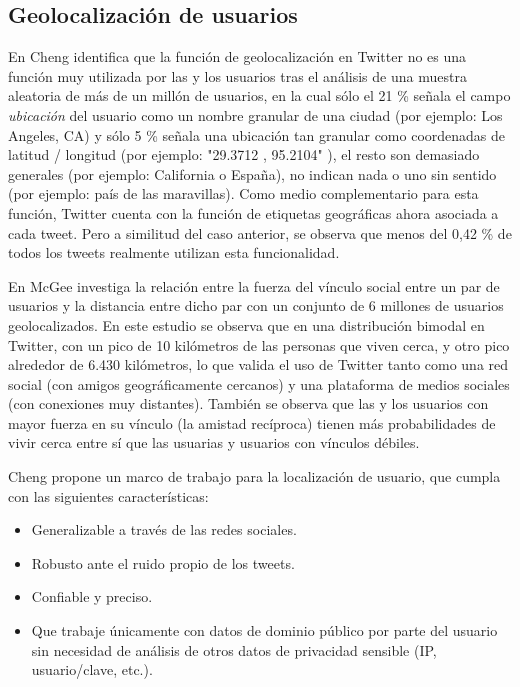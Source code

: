 \subsection{Geolocalización de usuarios} \label{sebsec:geoestadoarte}

 En \cite{Cheng:2010:YYT:1871437.1871535} Cheng identifica que la función de geolocalización en Twitter no es una función muy utilizada por las y los usuarios tras el análisis de una muestra aleatoria de más de un millón de usuarios, en la cual sólo el 21 \% señala el campo \emph{ubicación} del usuario como un nombre granular de una ciudad (por ejemplo: Los Angeles, CA) y sólo 5 \% señala una ubicación tan granular como coordenadas de latitud / longitud (por ejemplo: "29.3712 , 95.2104" ), el resto son demasiado generales (por ejemplo: California o España), no indican nada o uno sin sentido (por ejemplo: país de las maravillas). Como medio complementario para esta función, Twitter cuenta con la función de etiquetas geográficas ahora asociada a cada tweet. Pero a similitud del caso anterior, se observa que menos del 0,42 \% de todos los tweets realmente utilizan esta funcionalidad.

 En \cite{McGee:2011:GST:2063576.2063959} McGee investiga la relación entre la fuerza del vínculo social entre un par de usuarios y la distancia entre dicho par con un conjunto de 6 millones de usuarios geolocalizados. En este estudio se observa que en una distribución bimodal en Twitter, con un pico de 10 kilómetros de las personas que viven cerca, y otro pico alrededor de 6.430 kilómetros, lo que valida el uso de Twitter tanto como una red social (con amigos geográficamente cercanos) y una plataforma de medios sociales (con conexiones muy distantes). También se observa que las y los usuarios con mayor fuerza en su vínculo (la amistad recíproca) tienen más probabilidades de vivir cerca entre sí que las usuarias y usuarios con vínculos débiles.

Cheng propone un marco de trabajo para la localización de usuario, que cumpla con las siguientes características:
\begin{itemize}
 \item Generalizable a través de las redes sociales.
 \item Robusto ante el ruido propio de los tweets.
 \item Confiable y preciso.
 \item Que trabaje únicamente con datos de dominio público por parte del usuario sin necesidad de análisis de otros datos de privacidad sensible (IP, usuario/clave, etc.).
\end{itemize}

